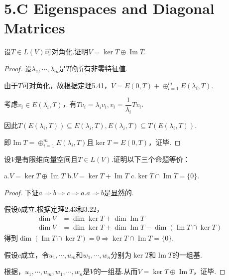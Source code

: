 \section{5.C Eigenspaces and Diagonal Matrices}

\begin{problem}[1]\label{5.C.1}
    设\(T \in L(V)\)可对角化.证明\(V=\ker T \oplus \operatorname{Im} T\).
\end{problem}

\begin{proof}
    设\(\lambda_1,\cdots,\lambda_m\)是\(T\)的所有非零特征值.

    由于\(T\)可对角化，故根据定理5.41，\(V=E(0,T)+\oplus_{i=1}^m E(\lambda_i,T)\).

    考虑\(v_i \in E(\lambda_i,T)\)，有\(Tv_i=\lambda_iv_i,v_i=\dfrac{1}{\lambda_i}Tv_i\).

    因此\(T(E(\lambda_i,T)) \subseteq E(\lambda_i,T),E(\lambda_i,T) \subseteq T(E(\lambda_i,T))\).

    即\(\operatorname{Im} T=\oplus_{i=1}^m E(\lambda_i,T)\)且\(\ker T=E(0,T)\)，证毕.
\end{proof}

\begin{problem}[3]\label{5.C.3}
    设\(V\)是有限维向量空间且\(T \in L(V)\).证明以下三个命题等价：

    a.\(V=\ker T \oplus \operatorname{Im} T\) \quad b.\(V=\ker T+\operatorname{Im} T\) \quad c.\(\ker T \cap \operatorname{Im} T=\{0\}\).
\end{problem}

\begin{proof}
    下证\(a \Rightarrow b \Rightarrow c \Rightarrow a\).\(a \Rightarrow b\)是显然的.

    假设\(b\)成立.根据定理2.43和3.22，
    \begin{align*}
        \dim V &= \dim \ker T+\dim \operatorname{Im} T \\
        \dim V &= \dim \ker T+\dim \operatorname{Im} T-\dim (\operatorname{Im} T \cap \ker T)
    \end{align*}
    得到\(\dim (\operatorname{Im} T \cap \ker T)=0 \Rightarrow \ker T \cap \operatorname{Im} T=\{0\}\).
    
    假设\(c\)成立，令\(u_1,\cdots,u_m\)和\(w_1,\cdots,w_n\)分别为\(\ker T\)和\(\operatorname{Im} T\)的一组基.
    
    根据，\(u_1,\cdots,u_m,w_1,\cdots,w_n\)是\(V\)的一组基.从而\(V=\ker T \oplus \operatorname{Im} T\)，证毕.
\end{proof}

